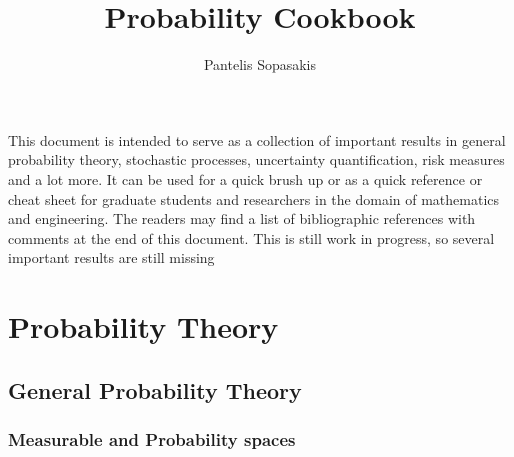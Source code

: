 \documentclass[a4paper,10pt]{scrbook}
\title{Probability Cookbook}
\author{Pantelis Sopasakis}
\begin{document}
\maketitle
\tableofcontents

  This document is intended to serve as a collection of important results in general probability
  theory, stochastic processes, uncertainty quantification, risk measures and a lot more.
  It can be used for a quick brush up or as a quick reference or 
  cheat sheet for graduate students and researchers in the domain of mathematics and 
  engineering. 
  The readers may find a list of bibliographic references with comments at the end
  of this document. This is still work in progress, so several important results are 
  still missing

\chapter{Probability Theory}
\section{General Probability Theory}

\subsection{Measurable and Probability spaces}
\end{document}
